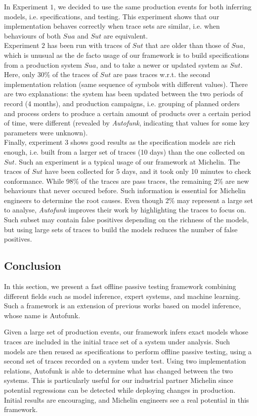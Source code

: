 In Experiment $1$, we decided to use the same production events
for both inferring models, i.e. specifications, and testing. This
experiment shows that our implementation
behaves correctly when trace sets are similar, i.e. when
behaviours of both $\mathit{Sua}$ and $\mathit{Sut}$ are equivalent.\\
Experiment $2$ has been run with traces of $\mathit{Sut}$ that are older
than those of $\mathit{Sua}$, which is unusual as the de facto usage of
our framework is to build specifications from a production system
$\mathit{Sua}$, and to take a newer or updated system as $\mathit{Sut}$.
Here, only 30\% of the traces of $\mathit{Sut}$ are pass traces w.r.t.
the second implementation relation (same sequence of symbols with
different values). There are two explanations: the system has
been updated between the two periods of record (4 months), and
production campaigns, i.e. grouping of planned orders and process
orders to produce a certain amount of products over a certain
period of time, were different (revealed by \textit{Autofunk},
indicating that values for some key parameters were unknown).\\
Finally, experiment $3$ shows good results as the specification
models are rich enough, i.e.  built from a larger set of traces
(10 days) than the one collected on $\mathit{Sut}$. Such an experiment
is a typical usage of our framework at Michelin.
The traces of $\mathit{Sut}$ have been collected for 5 days, and
it took only 10 minutes to check conformance. While 98\% of the
traces are pass traces, the remaining 2\% are new behaviours that
never occured before. Such information is essential for Michelin
engineers to determine the root causes. Even though 2\% may
represent a large set to analyse, \textit{Autofunk} improves
their work by highlighting the traces to focus on.
Such subset may contain false positives depending on the
richness of the models, but using large sets of traces to build
the models reduces the number of false positives.


\subsection{Conclusion}
\label{sec:testing:offpassive:conclusion}

In this section, we present a fast offline passive testing
framework combining different fields such as model inference,
expert systems, and machine learning. Such a framework is an
extension of previous works based on model inference, whose name
is Autofunk.

Given a large set of production events, our framework infers
exact models whose traces are included in the initial trace set
of a system under analysis.  Such models are then reused as
specifications to perform offline passive testing, using a second
set of traces recorded on a system under test.  Using two
implementation relations, Autofunk is able to determine what has
changed between the two systems. This is particularly useful for
our industrial partner Michelin since potential regressions can
be detected while deploying changes in production. Initial
results are encouraging, and Michelin engineers see a real
potential in this framework.
